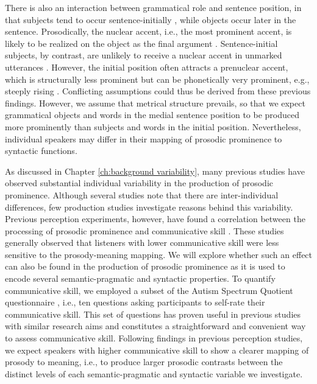 There is also an interaction between grammatical role and sentence position, in that subjects tend to occur sentence-initially \citep{himmelmannProminenceProsodyFirst2015}, while objects occur later in the sentence. Prosodically, the nuclear accent, i.e., the most prominent accent, is likely to be realized on the object as the final argument  \citep{griceGermanIntonationAutosegmentalMetrical2005}. Sentence-initial subjects, by contrast, are unlikely to receive a nuclear accent in unmarked utterances \citep{feryGermanIntonationalPatterns1993}. However, the initial position often attracts a prenuclear accent, which is structurally less prominent but can be phonetically very prominent, e.g., steeply rising \citep{baumannInfluenceInformativenessProsody2021}. Conflicting assumptions could thus be derived from these previous findings. However, we assume that metrical structure prevails, so that we expect grammatical objects and words in the medial sentence position to be produced more prominently than subjects and words in the initial position. Nevertheless, individual speakers may differ in their mapping of prosodic prominence to syntactic functions.

As discussed in Chapter \ref{ch:background variability}, many previous studies have observed substantial individual variability in the production of prosodic prominence. Although several studies note that there are inter-individual differences, few production studies investigate reasons behind this variability. Previous perception experiments, however, have found a correlation between the processing of prosodic prominence and communicative skill \citep[e.g.,][]{bishopPhonologyPhoneticsSignalextrinsic2020, orricoInfluenceEmpathyAutisticlike2023}. These studies generally observed that listeners with lower communicative skill were less sensitive to the prosody-meaning mapping. We will explore whether such an effect can also be found in the production of prosodic prominence as it is used to encode several semantic-pragmatic and syntactic properties. To quantify communicative skill, we employed a subset of the Autism Spectrum Quotient questionnaire \citep{baron-cohenAutismSpectrumQuotientAQ2006}, i.e., ten questions asking participants to self-rate their communicative skill. This set of questions has proven useful in previous studies with similar research aims \citep[e.g.][]{bishopPhonologyPhoneticsSignalextrinsic2020} and constitutes a straightforward and convenient way to assess communicative skill. Following findings in previous perception studies, we expect speakers with higher communicative skill to show a clearer mapping of prosody to meaning, i.e., to produce larger prosodic contrasts between the distinct levels of each semantic-pragmatic and syntactic variable we investigate.

